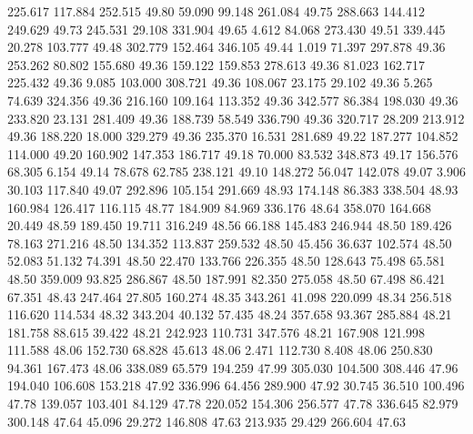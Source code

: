  225.617  117.884  252.515        49.80
  59.090   99.148  261.084        49.75
 288.663  144.412  249.629        49.73
 245.531   29.108  331.904        49.65
   4.612   84.068  273.430        49.51
 339.445   20.278  103.777        49.48
 302.779  152.464  346.105        49.44
   1.019   71.397  297.878        49.36
 253.262   80.802  155.680        49.36
 159.122  159.853  278.613        49.36
  81.023  162.717  225.432        49.36
   9.085  103.000  308.721        49.36
 108.067   23.175   29.102        49.36
   5.265   74.639  324.356        49.36
 216.160  109.164  113.352        49.36
 342.577   86.384  198.030        49.36
 233.820   23.131  281.409        49.36
 188.739   58.549  336.790        49.36
 320.717   28.209  213.912        49.36
 188.220   18.000  329.279        49.36
 235.370   16.531  281.689        49.22
 187.277  104.852  114.000        49.20
 160.902  147.353  186.717        49.18
  70.000   83.532  348.873        49.17
 156.576   68.305    6.154        49.14
  78.678   62.785  238.121        49.10
 148.272   56.047  142.078        49.07
   3.906   30.103  117.840        49.07
 292.896  105.154  291.669        48.93
 174.148   86.383  338.504        48.93
 160.984  126.417  116.115        48.77
 184.909   84.969  336.176        48.64
 358.070  164.668   20.449        48.59
 189.450   19.711  316.249        48.56
  66.188  145.483  246.944        48.50
 189.426   78.163  271.216        48.50
 134.352  113.837  259.532        48.50
  45.456   36.637  102.574        48.50
  52.083   51.132   74.391        48.50
  22.470  133.766  226.355        48.50
 128.643   75.498   65.581        48.50
 359.009   93.825  286.867        48.50
 187.991   82.350  275.058        48.50
  67.498   86.421   67.351        48.43
 247.464   27.805  160.274        48.35
 343.261   41.098  220.099        48.34
 256.518  116.620  114.534        48.32
 343.204   40.132   57.435        48.24
 357.658   93.367  285.884        48.21
 181.758   88.615   39.422        48.21
 242.923  110.731  347.576        48.21
 167.908  121.998  111.588        48.06
 152.730   68.828   45.613        48.06
   2.471  112.730    8.408        48.06
 250.830   94.361  167.473        48.06
 338.089   65.579  194.259        47.99
 305.030  104.500  308.446        47.96
 194.040  106.608  153.218        47.92
 336.996   64.456  289.900        47.92
  30.745   36.510  100.496        47.78
 139.057  103.401   84.129        47.78
 220.052  154.306  256.577        47.78
 336.645   82.979  300.148        47.64
  45.096   29.272  146.808        47.63
 213.935   29.429  266.604        47.63
